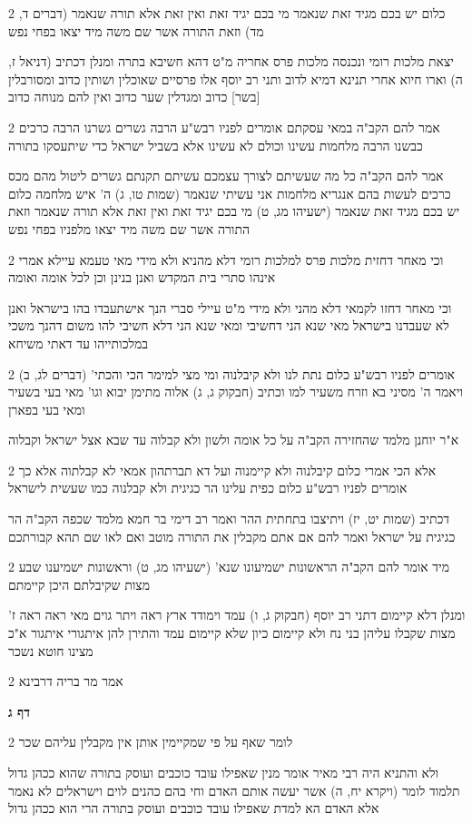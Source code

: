 \documentclass[12pt, openany]{book}
\newcommand{\sethebfont}{
\fontsize{10.5pt}{21.0pt} \selectfont
}
\newcommand{\twocol}[1]{
	{\sethebfont \begin{multicols}{2}
			#1
	\end{multicols}}	
}
\newcommand{\sectname}{}
\newcommand{\newsection}[1]{
	\addcontentsline{toc}{section}{#1}
	\renewcommand{\sectname}{#1}	
	\vspace{-\baselineskip}
	\begin{center}
		\textbf{%
\fontsize{16pt}{16pt}\selectfont
			#1}
	\end{center}
	\vspace{-\baselineskip}
	\nopagebreak
}
\begin{document}
\twocol{כלום יש בכם מגיד זאת שנאמר מי בכם יגיד זאת ואין זאת אלא תורה שנאמר (דברים ד, מד) וזאת התורה אשר שם משה מיד יצאו בפחי נפש
\par יצאת מלכות רומי ונכנסה מלכות פרס אחריה מ"ט דהא חשיבא בתרה ומנלן דכתיב (דניאל ז, ה) וארו חיוא אחרי תנינא דמיא לדוב ותני רב יוסף אלו פרסיים שאוכלין ושותין כדוב ומסורבלין [בשר] כדוב ומגדלין שער כדוב ואין להם מנוחה כדוב}
\twocol{אמר להם הקב"ה במאי עסקתם אומרים לפניו רבש"ע הרבה גשרים גשרנו הרבה כרכים כבשנו הרבה מלחמות עשינו וכולם לא עשינו אלא בשביל ישראל כדי שיתעסקו בתורה
\par אמר להם הקב"ה כל מה שעשיתם לצורך עצמכם עשיתם תקנתם גשרים ליטול מהם מכס כרכים לעשות בהם אנגריא מלחמות אני עשיתי שנאמר (שמות טו, ג) ה' איש מלחמה כלום יש בכם מגיד זאת שנאמר (ישעיהו מג, ט) מי בכם יגיד זאת ואין זאת אלא תורה שנאמר וזאת התורה אשר שם משה מיד יצאו מלפניו בפחי נפש}
\twocol{וכי מאחר דחזית מלכות פרס למלכות רומי דלא מהניא ולא מידי מאי טעמא עיילא אמרי אינהו סתרי בית המקדש ואנן בנינן וכן לכל אומה ואומה
\par וכי מאחר דחזו לקמאי דלא מהני ולא מידי מ"ט עיילי סברי הנך אישתעבדו בהו בישראל ואנן לא שעבדנו בישראל מאי שנא הני דחשיבי ומאי שנא הני דלא חשיבי להו משום דהנך משכי במלכותייהו עד דאתי משיחא}
\twocol{אומרים לפניו רבש"ע כלום נתת לנו ולא קיבלנוה ומי מצי למימר הכי והכתי' (דברים לג, ב) ויאמר ה' מסיני בא וזרח משעיר למו וכתיב (חבקוק ג, ג) אלוה מתימן יבוא וגו' מאי בעי בשעיר ומאי בעי בפארן
\par א"ר יוחנן מלמד שהחזירה הקב"ה על כל אומה ולשון ולא קבלוה עד שבא אצל ישראל וקבלוה}
\twocol{אלא הכי אמרי כלום קיבלנוה ולא קיימנוה ועל דא תברתהון אמאי לא קבלתוה אלא כך אומרים לפניו רבש"ע כלום כפית עלינו הר כגיגית ולא קבלנוה כמו שעשית לישראל
\par דכתיב (שמות יט, יז) ויתיצבו בתחתית ההר ואמר רב דימי בר חמא מלמד שכפה הקב"ה הר כגיגית על ישראל ואמר להם אם אתם מקבלין את התורה מוטב ואם לאו שם תהא קבורתכם}
\twocol{מיד אומר להם הקב"ה הראשונות ישמיעונו שנא' (ישעיהו מג, ט) וראשונות ישמיענו שבע מצות שקיבלתם היכן קיימתם
\par ומנלן דלא קיימום דתני רב יוסף (חבקוק ג, ו) עמד וימודד ארץ ראה ויתר גוים מאי ראה ראה ז' מצות שקבלו עליהן בני נח ולא קיימום כיון שלא קיימום עמד והתירן להן איתגורי איתגור א"כ מצינו חוטא נשכר}
\twocol{אמר מר בריה דרבינא}
\newsection{דף ג}
\twocol{לומר שאף על פי שמקיימין אותן אין מקבלין עליהם שכר
\par ולא והתניא היה רבי מאיר אומר מנין שאפילו עובד כוכבים ועוסק בתורה שהוא ככהן גדול תלמוד לומר (ויקרא יח, ה) אשר יעשה אותם האדם וחי בהם כהנים לוים וישראלים לא נאמר אלא האדם הא למדת שאפילו עובד כוכבים ועוסק בתורה הרי הוא ככהן גדול}
\end{document}
